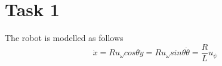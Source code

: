\documentclass[a4paper,12pt,oneside,onecolumn]{article} %
\begin{document}
% 
%
%
%
\section*{Task 1}
The robot is modelled as follows
\begin{subequations}
\begin{equation}
\label{eq:xdot}
\dot{x} = R u_\omega cos\theta
\end{equation}
\begin{equation}
\label{eq:ydot}
\dot{y} = R u_\omega sin\theta
\end{equation}
\begin{equation}
\label{eq:thetadot}
\dot{\theta} = \frac{R}{L} u_\psi
\end{equation}
\end{subequations}
\end{document}
